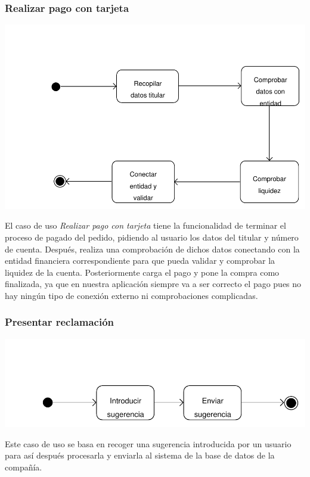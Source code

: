 \documentclass[11pt, a4paper, twoside, titlepage]{article}
\begin{document}
			\subsubsection{Realizar pago con tarjeta}
				\begin{center}
					\includegraphics[scale=.7]{analisis/diagramas/da_pagotarjeta.pdf}
				\end{center}
				El caso de uso {\itshape Realizar pago con tarjeta} tiene la funcionalidad de terminar el proceso de pagado del pedido, pidiendo al usuario los datos del titular y número de cuenta. Después, realiza una comprobación de dichos datos conectando con la entidad financiera correspondiente para que pueda validar y comprobar la liquidez de la cuenta. Posteriormente carga el pago y pone la compra como finalizada, ya que en nuestra aplicación siempre va a ser correcto el pago pues no hay ningún tipo de conexión externo ni comprobaciones complicadas.
				
			\subsubsection{Presentar reclamación}
				\begin{center}
					\includegraphics[scale=.82]{analisis/diagramas/da_presentarreclamacion.pdf}
				\end{center}
				Este caso de uso se basa en recoger una sugerencia introducida por un usuario para así después procesarla y enviarla al sistema de la base de datos de la compañía.
\end{document}
